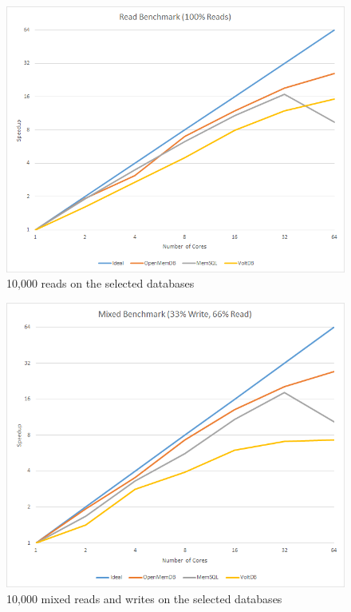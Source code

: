 \documentclass[conference, compsoc]{IEEEtran}
\begin{document}
\begin{figure}[H]
   \begin{center}
   \includegraphics[scale=.5]{ReadBenchmark.png}
  \caption{10,000 reads on the selected databases}
  \label{fig:readBenchmark}
   \end{center}
\end{figure}

\begin{figure}[H]
 \begin{center}
   \includegraphics[scale=.5]{MixedBenchmark.png}
  \caption{10,000 mixed reads and writes on the selected databases}
  \label{fig:mixedBenchmark}
   \end{center}
\end{figure}
\end{document}
